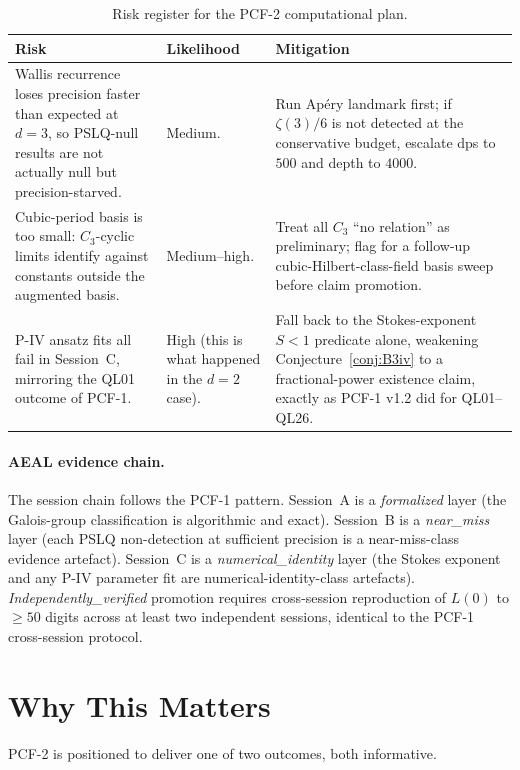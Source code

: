 \documentclass[11pt,a4paper]{article}
\theoremstyle{definition}
\theoremstyle{remark}
\begin{document}
\begin{table}[h]
\centering
\small
\begin{tabular}{p{}p{}p{}}
\toprule
Risk & Likelihood & Mitigation \\
\midrule
Wallis recurrence loses precision faster than expected at $d=3$, so
PSLQ-null results are not actually null but precision-starved. & Medium. & Run Ap\'ery landmark first; if $\zeta(3)/6$ is not detected at the conservative budget, escalate dps to $500$ and depth to $4000$. \\
Cubic-period basis is too small: $C_{3}$-cyclic limits identify against
constants outside the augmented basis. & Medium--high. & Treat all $C_{3}$ ``no relation'' as pre\-li\-mi\-na\-ry; flag for a follow-up cubic-Hilbert-class-field basis sweep before claim promotion. \\
P-IV ansatz fits all fail in Session~C, mirroring the QL01 outcome of
PCF-1. & High (this is what happened in the $d=2$ case). & Fall back to the Stokes-exponent $S<1$ predicate alone, weakening Conjecture~\ref{conj:B3iv} to a fractional-power existence claim, exactly as PCF-1 v1.2 did for QL01--QL26. \\
\bottomrule
\end{tabular}
\caption{Risk register for the PCF-2 computational plan.}
\label{tab:risks}
\end{table}

\paragraph{AEAL evidence chain.}
The session chain follows the PCF-1 pattern. Session~A is a
\emph{formalized} layer (the Galois-group classification is algorithmic
and exact). Session~B is a \emph{near\_miss} layer (each PSLQ
non-detection at sufficient precision is a near-miss-class evidence
artefact). Session~C is a \emph{numerical\_identity} layer (the Stokes
exponent and any P-IV parameter fit are numerical-identity-class
artefacts). \emph{Independently\_verified} promotion requires
cross-session reproduction of $L(0)$ to $\ge 50$ digits across at least
two independent sessions, identical to the PCF-1 cross-session protocol.

\section{Why This Matters}\label{sec:why}

PCF-2 is positioned to deliver one of two outcomes, both informative.
\end{document}
